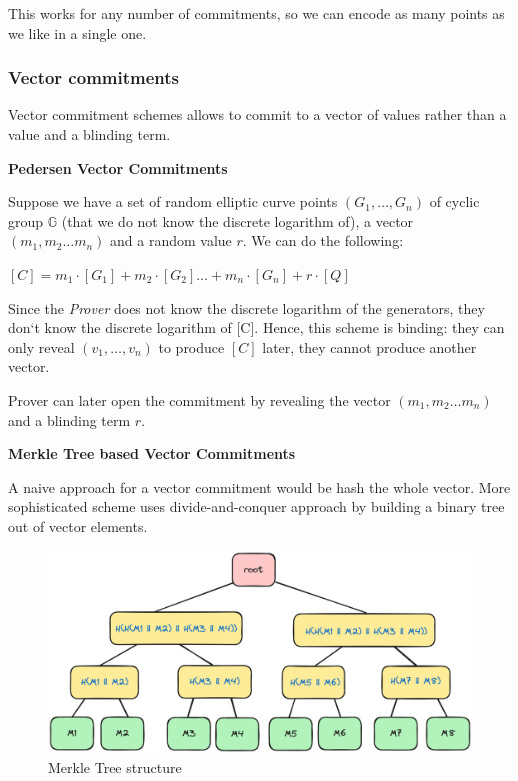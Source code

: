 \documentclass[../lecture-notes.tex]{subfiles}
\begin{document}
This works for any number of commitments, so we can encode as many points as we like in a single one.

\vspace{0.5 cm}

\subsubsection{Vector commitments}

Vector commitment schemes allows to commit to a vector of values rather than a value and a blinding term.

\vspace{0.5 cm}

\textbf{Pedersen Vector Commitments}

Suppose we have a set of random elliptic curve points $(G_1, \ldots ,G_n)$ of cyclic group $\mathbb{G}$ 
(that we do not know the discrete logarithm of), a vector $(m_1, m_2 \ldots m_n)$ and a random value $r$. We can do the following:

\begin{center}
    $ [C] = m_1\cdot[G_1] + m_2 \cdot [G_2] \ldots + m_n \cdot [G_n] + r \cdot [Q]$ 
\end{center}

Since the \textit{Prover} does not know the discrete logarithm of the generators, they don`t know the discrete logarithm of [C]. 
Hence, this scheme is binding: they can only reveal $(v_1, \ldots ,v_n)$ to produce $[C]$ later, they cannot produce another vector.

Prover can later open the commitment by revealing the vector $(m_1, m_2 \ldots m_n)$ and a blinding term $r$.

\vspace{0.5 cm}

\textbf{Merkle Tree based Vector Commitments}

A naive approach for a vector commitment would be hash the whole vector. More sophisticated scheme uses divide-and-conquer approach by building a binary tree out of vector elements.

\begin{figure}[H]
    \centering\includegraphics[width=0.9\linewidth, clip]{images/lecture_5/MerkleTree.png}

    \caption{Merkle Tree structure}
\end{figure}
\end{document}
